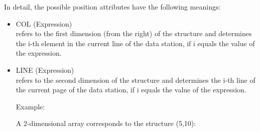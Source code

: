 In detail, the possible position attributes have the following
meanings:
\begin{itemize}
\item COL (Expression)\\
refers to the first dimension (from the right) of the structure and
determines the i-th element in the current line of the data station, if
i equals the value of the expression.
\item LINE (Expression)\\
refers to the second dimension of the structure and determines the i-th
line of the current page of the data station, if i equals the value of
the expression.

Example:

A 2-dimensional array corresponds to the structure (5,10):


\end{itemize}
